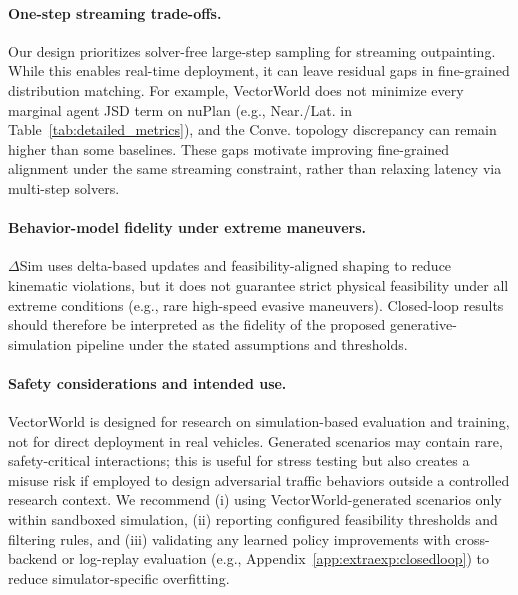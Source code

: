 \documentclass{article}
\theoremstyle{plain}
\theoremstyle{definition}
\theoremstyle{remark}
\begin{document}
\paragraph{One-step streaming trade-offs.}
Our design prioritizes solver-free large-step sampling for streaming outpainting.
While this enables real-time deployment, it can leave residual gaps in fine-grained distribution matching.
For example, VectorWorld does not minimize every marginal agent JSD term on nuPlan (e.g., Near./Lat. in Table~\ref{tab:detailed_metrics}),
and the Conve. topology discrepancy can remain higher than some baselines.
These gaps motivate improving fine-grained alignment under the same streaming constraint, rather than relaxing latency via multi-step solvers.

\paragraph{Behavior-model fidelity under extreme maneuvers.}
\(\Delta\)Sim uses delta-based updates and feasibility-aligned shaping to reduce kinematic violations, but it does not guarantee strict physical feasibility
under all extreme conditions (e.g., rare high-speed evasive maneuvers).
Closed-loop results should therefore be interpreted as the fidelity of the proposed generative-simulation pipeline under the stated assumptions and thresholds.

\paragraph{Safety considerations and intended use.}
VectorWorld is designed for research on simulation-based evaluation and training, not for direct deployment in real vehicles.
Generated scenarios may contain rare, safety-critical interactions; this is useful for stress testing but also creates a misuse risk if employed to
design adversarial traffic behaviors outside a controlled research context.
We recommend (i) using VectorWorld-generated scenarios only within sandboxed simulation, (ii) reporting configured feasibility thresholds and filtering rules,
and (iii) validating any learned policy improvements with cross-backend or log-replay evaluation (e.g., Appendix~\ref{app:extraexp:closedloop})
to reduce simulator-specific overfitting.
\end{document}
